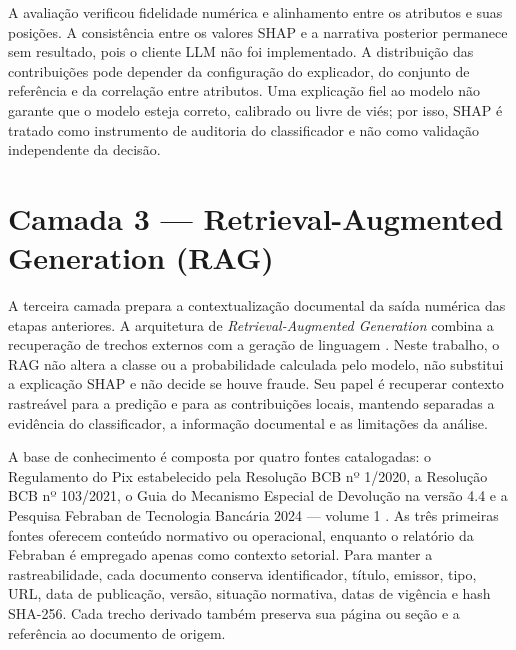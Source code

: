 A avaliação verificou fidelidade numérica e alinhamento entre os atributos e suas posições. A consistência entre os valores SHAP e a narrativa posterior permanece sem resultado, pois o cliente LLM não foi implementado. A distribuição das contribuições pode depender da configuração do explicador, do conjunto de referência e da correlação entre atributos. Uma explicação fiel ao modelo não garante que o modelo esteja correto, calibrado ou livre de viés; por isso, SHAP é tratado como instrumento de auditoria do classificador e não como validação independente da decisão.

\section{Camada 3 --- Retrieval-Augmented Generation (RAG)}

A terceira camada prepara a contextualização documental da saída numérica das etapas anteriores. A arquitetura de \emph{Retrieval-Augmented Generation} combina a recuperação de trechos externos com a geração de linguagem \cite{lewis2020rag}. Neste trabalho, o RAG não altera a classe ou a probabilidade calculada pelo modelo, não substitui a explicação SHAP e não decide se houve fraude. Seu papel é recuperar contexto rastreável para a predição e para as contribuições locais, mantendo separadas a evidência do classificador, a informação documental e as limitações da análise.

A base de conhecimento é composta por quatro fontes catalogadas: o Regulamento do Pix estabelecido pela Resolução BCB nº 1/2020, a Resolução BCB nº 103/2021, o Guia do Mecanismo Especial de Devolução na versão 4.4 e a Pesquisa Febraban de Tecnologia Bancária 2024 --- volume 1 \cite{bcb_resolucao1_2020,bcb_resolucao103_2021,bcb_guia_med_v44,febraban2024}. As três primeiras fontes oferecem conteúdo normativo ou operacional, enquanto o relatório da Febraban é empregado apenas como contexto setorial. Para manter a rastreabilidade, cada documento conserva identificador, título, emissor, tipo, URL, data de publicação, versão, situação normativa, datas de vigência e hash SHA-256. Cada trecho derivado também preserva sua página ou seção e a referência ao documento de origem.

